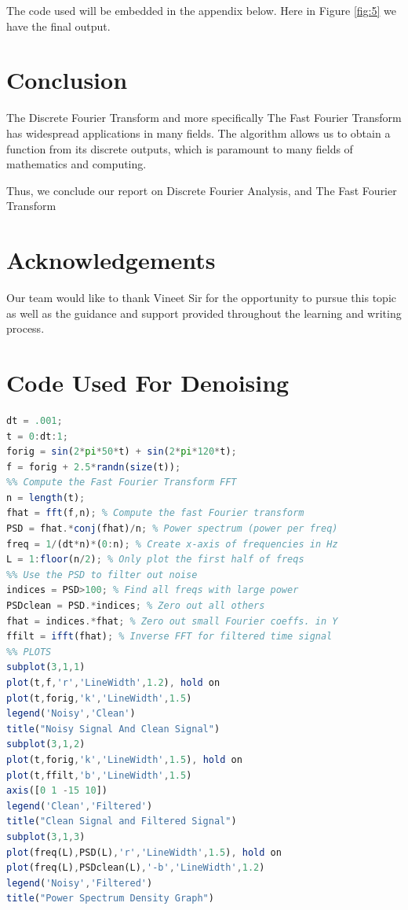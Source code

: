 \documentclass[11pt]{amsart}
\theoremstyle{definition}
\theoremstyle{remark}
\numberwithin{equation}{section}
\begin{document}
The code used will be embedded in the appendix below. Here in Figure \ref{fig:5} we have the final output.
\section{Conclusion}
The Discrete Fourier Transform and more specifically The Fast Fourier Transform has widespread applications in many fields. The algorithm allows us to obtain a function from its discrete outputs, which is paramount to many fields of mathematics and computing.

Thus, we conclude our report on Discrete Fourier Analysis, and The Fast Fourier Transform
\section*{Acknowledgements}
Our team would like to thank Vineet Sir for the opportunity to pursue this topic as well as the guidance and support provided throughout the learning and writing process.
\appendix
\section{Code Used For Denoising}
\begin{lstlisting}[language=Octave]
dt = .001;
t = 0:dt:1;
forig = sin(2*pi*50*t) + sin(2*pi*120*t); 
f = forig + 2.5*randn(size(t)); 
%% Compute the Fast Fourier Transform FFT
n = length(t);
fhat = fft(f,n); % Compute the fast Fourier transform
PSD = fhat.*conj(fhat)/n; % Power spectrum (power per freq)
freq = 1/(dt*n)*(0:n); % Create x-axis of frequencies in Hz
L = 1:floor(n/2); % Only plot the first half of freqs
%% Use the PSD to filter out noise
indices = PSD>100; % Find all freqs with large power
PSDclean = PSD.*indices; % Zero out all others
fhat = indices.*fhat; % Zero out small Fourier coeffs. in Y
ffilt = ifft(fhat); % Inverse FFT for filtered time signal
%% PLOTS
subplot(3,1,1)
plot(t,f,'r','LineWidth',1.2), hold on
plot(t,forig,'k','LineWidth',1.5)
legend('Noisy','Clean')
title("Noisy Signal And Clean Signal")
subplot(3,1,2)
plot(t,forig,'k','LineWidth',1.5), hold on
plot(t,ffilt,'b','LineWidth',1.5)
axis([0 1 -15 10])
legend('Clean','Filtered')
title("Clean Signal and Filtered Signal")
subplot(3,1,3)
plot(freq(L),PSD(L),'r','LineWidth',1.5), hold on
plot(freq(L),PSDclean(L),'-b','LineWidth',1.2)
legend('Noisy','Filtered')
title("Power Spectrum Density Graph")
\end{lstlisting}


\end{document}
